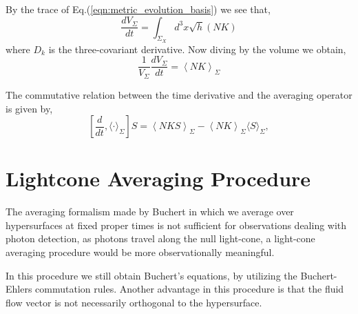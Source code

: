 By the trace of Eq.(\ref{eqn:metric_evolution_basis}) we see that,
\begin{equation}
	\frac{d V_\Sigma}{dt} =\int_{\Sigma_X}d^3x \sqrt{h}\left(NK\right)
\end{equation}
where $D_k$ is the three-covariant derivative.
Now diving by the volume we obtain,
\begin{equation}
	\frac{1}{V_\Sigma}\frac{d V_\Sigma}{dt} = \left\langle NK \right\rangle_{\Sigma}
	\label{eqn:general_volume_buchert}
\end{equation}

The commutative relation between the time derivative and the averaging operator is given by,
\begin{equation}
	\left[\frac{d}{dt}, \langle\cdot \rangle_{\Sigma}\right] S=\left\langle NKS\right\rangle_{\Sigma}-\left\langle NK \right\rangle_{\Sigma}\langle S\rangle_{\Sigma},
	\label{eqn:comoving_commutation_rule_buchert}
\end{equation}






\section{Lightcone Averaging Procedure}

The averaging formalism made by Buchert in which we average over hypersurfaces at fixed proper times is not sufficient for observations dealing with photon detection, as photons travel along the null light-cone, a light-cone averaging procedure would be more observationally meaningful\cite{Gasperini_2011}.

In this procedure we still obtain Buchert's equations, by utilizing the Buchert-Ehlers commutation rules\cite{Gasperini_2010}. Another advantage in this procedure is that the fluid flow vector is not necessarily orthogonal to the hypersurface.

